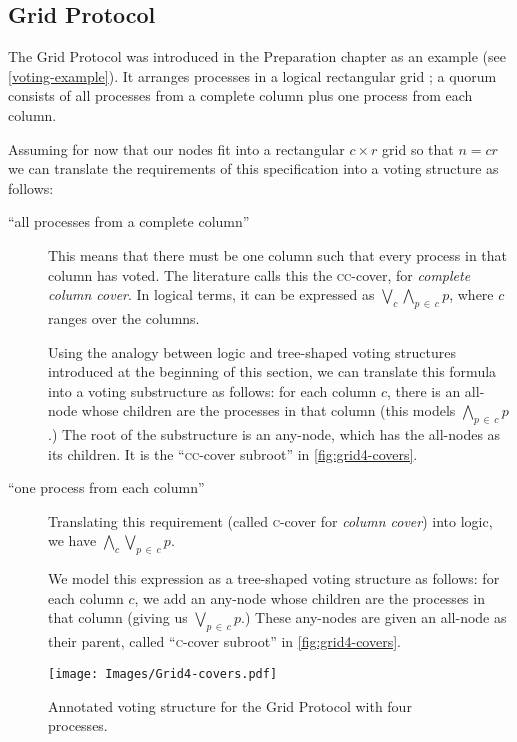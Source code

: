 \documentclass[draft,11pt,chapterprefix=true,toc=bibliography,numbers=noendperiod,
               footnotes=multiple,twoside]{scrreprt}
\begin{document}
\subsection{Grid Protocol}

The Grid Protocol was introduced in the Preparation chapter as an example (see \autoref{voting-example}). It arranges processes in a logical rectangular grid \autocite{grid}; a quorum consists of all processes from a complete column plus one process from each column.

Assuming for now that our nodes fit into a rectangular \(c \times r\) grid so that \(n = c r\) we can translate the requirements of this specification into a voting structure as follows:

\begin{description}
    \item[\enquote{all processes from a complete column}] This means that there must be one column such that every process in that column has voted. The literature calls this the \textsc{cc}-cover, for \emph{complete column cover}. In logical terms, it can be expressed as \(\bigvee_c \bigwedge_{p\,\in\,c} p \), where \(c\) ranges over the columns.

        Using the analogy between logic and tree-shaped voting structures introduced at the beginning of this section, we can translate this formula into a voting substructure as follows: for each column \(c\), there is an all-node whose children are the processes in that column (this models \(\bigwedge_{p\,\in\,c} p \).) The root of the substructure is an any-node, which has the all-nodes as its children. It is the \enquote{\textsc{cc}-cover subroot} in \autoref{fig:grid4-covers}.

    \item[\enquote{one process from each column}] Translating this requirement (called \textsc{c}-cover for \emph{column cover}) into logic, we have \(\bigwedge_c \bigvee_{p\,\in\,c} p \).

        We model this expression as a tree-shaped voting structure as follows: for each column \(c\), we add an any-node whose children are the processes in that column (giving us \(\bigvee_{p\,\in\,c} p \).) These any-nodes are given an all-node as their parent, called \enquote{\textsc{c}-cover subroot} in \autoref{fig:grid4-covers}.
\end{description}

\begin{figure}[h]
    \centering
    \texttt{[image: Images/Grid4-covers.pdf]}
    \caption{Annotated voting structure for the Grid Protocol with four processes.}
    \label{fig:grid4-covers}
\end{figure}
\end{document}
